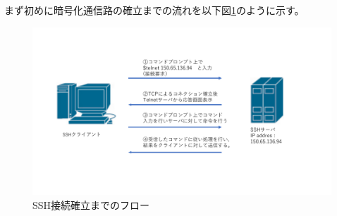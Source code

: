 \documentclass[11pt,a4j,titlepage]{jreport}
\begin{document}
まず初めに暗号化通信路の確立までの流れを以下図\ref{SSH_flow}のように示す。
\begin{figure}[h]
    \centering
    \includegraphics[width=1.0\textwidth, page=5]{graphs/network_archtecture.pdf}
    \caption{SSH接続確立までのフロー}
    \label{SSH_flow}
\end{figure}

\end{document}
